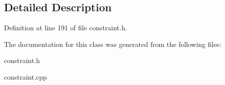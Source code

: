 \subsection{Detailed Description}


Definition at line 191 of file constraint.h.



The documentation for this class was generated from the following files:\begin{DoxyCompactItemize}
\item 
constraint.h\item 
constraint.cpp\end{DoxyCompactItemize}
